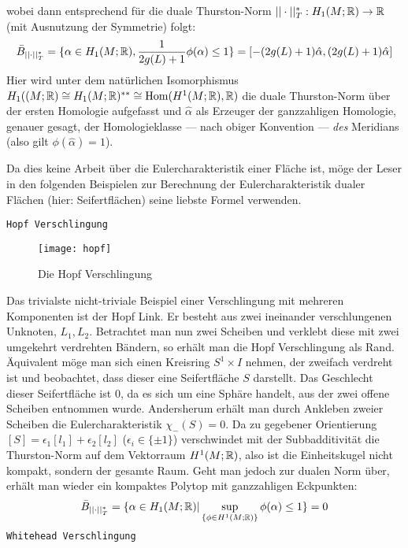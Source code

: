         wobei dann entsprechend für die duale Thurston-Norm $||\cdot||_T^* : H_1(M;\mathbb{R})\to \mathbb{R}$ (mit Ausnutzung der Symmetrie) folgt:
        \[
            \bar B_{||\cdot||_T^*} = \{\alpha \in H_1(M;\mathbb{R}), \frac{1}{2g(L)+1}\phi (\alpha)\leq 1\} = {[-(2g(L)+1)\hat \alpha, (2g(L)+1) \hat \alpha]}
        \]
        Hier wird unter dem natürlichen Isomorphismus $H_1((M;\mathbb{R}) \cong H_1(M;\mathbb{R})^{**} \cong \operatorname{Hom}(H^1(M;\mathbb{R}),\mathbb{R})$ die duale Thurston-Norm über der ersten Homologie aufgefasst und $\hat \alpha$ als Erzeuger der ganzzahligen Homologie, genauer gesagt, der Homologieklasse --- nach obiger Konvention --- \emph{des} Meridians (also gilt $\phi(\hat \alpha)=1$). 
        \begin{bem}
            Da dies keine Arbeit über die Eulercharakteristik einer Fläche ist, möge der Leser in den folgenden Beispielen zur Berechnung der Eulercharakteristik dualer Flächen (hier: Seifertflächen) seine liebste Formel verwenden.
        \end{bem}
        \texttt{Hopf Verschlingung}
        \begin{wrapfigure}{r}{0.4\textwidth}
            \centering
            \texttt{[image: hopf]}
            \caption{Die Hopf Verschlingung}
            \label{fig:hopf}
        \end{wrapfigure}
        Das trivialste nicht-triviale Beispiel einer Verschlingung mit mehreren Komponenten ist der Hopf Link. Er besteht aus zwei ineinander verschlungenen Unknoten, $L_1, L_2$. Betrachtet man nun zwei Scheiben und verklebt diese mit zwei umgekehrt verdrehten Bändern, so erhält man die Hopf Verschlingung als Rand. Äquivalent möge man sich einen Kreisring $S^1 \times I$ nehmen, der zweifach verdreht ist und beobachtet, dass dieser eine Seifertfläche $S$ darstellt. Das Geschlecht dieser Seifertfläche ist $0$, da es sich um eine Sphäre handelt, aus der zwei offene Scheiben entnommen wurde. Andersherum erhält man durch Ankleben zweier Scheiben die Eulercharakteristik $\chi_-(S)=0$. Da zu gegebener Orientierung $[S] = \epsilon_1 [l_1]+ \epsilon_2 [l_2]$ ($\epsilon_i \in \{\pm 1\}$) verschwindet mit der Subbadditivität die Thurston-Norm auf dem Vektorraum $H^1(M;\mathbb{R})$, also ist die Einheitskugel nicht kompakt, sondern der gesamte Raum. Geht man jedoch zur dualen Norm über, erhält man wieder ein kompaktes Polytop mit ganzzahligen Eckpunkten: 
        \[
              \bar B_{||\cdot||_T^*}= \{\alpha \in H_1(M;\mathbb{R})| \sup_{\{\phi \in H^1(M;\mathbb{R})\}} \phi(\alpha)\leq 1\}=0
        \] 
        \texttt{Whitehead Verschlingung}
